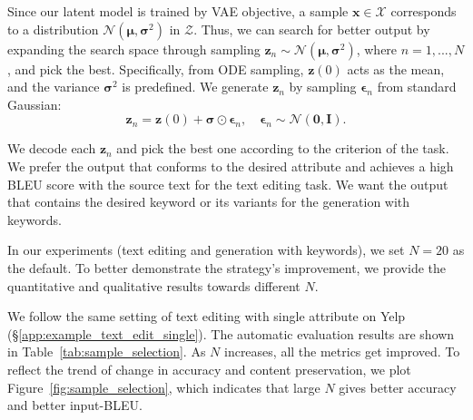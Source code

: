 \documentclass[11pt]{article}
\begin{document}
Since our latent model is trained by VAE objective, a sample $\bm x \in\mathcal{X}$ corresponds to a distribution $\mathcal{N}(\bm\mu,\bm\sigma^2)$ in $\mathcal{Z}$. Thus, we can search for better output by expanding the search space through sampling $\bm z_n\sim\mathcal{N}(\bm\mu,\bm\sigma^2)$, where $n=1,..., N$, and pick the best. 
Specifically, from ODE sampling, $\bm z(0)$ acts as the mean, and the variance $\bm \sigma^2$ is predefined. We generate $\bm z_n$ by sampling $\bm\epsilon_n$ from standard Gaussian:
\begin{equation}
    \bm z_n = \bm z(0) + \bm\sigma\odot\bm\epsilon_n, \quad \bm \epsilon_n\sim\mathcal N(\bm 0, \bm I).
\end{equation}

We decode each $\bm z_n$ and pick the best one according to the criterion of the task. We prefer the output that conforms to the desired attribute and achieves a high BLEU score with the source text for the text editing task. We want the output that contains the desired keyword or its variants for the generation with keywords. 

In our experiments (text editing and generation with keywords), we set $N=20$ as the default. To better demonstrate the strategy's improvement, we provide the quantitative and qualitative results towards different $N$.

We follow the same setting of text editing with single attribute on Yelp (\S\ref{app:example_text_edit_single}). The automatic evaluation results are shown in Table~\ref{tab:sample_selection}. As $N$ increases, all the metrics get improved. To reflect the trend of change in accuracy and content preservation, we plot Figure~\ref{fig:sample_selection}, which indicates that large $N$ gives better accuracy and better input-BLEU.
\end{document}

